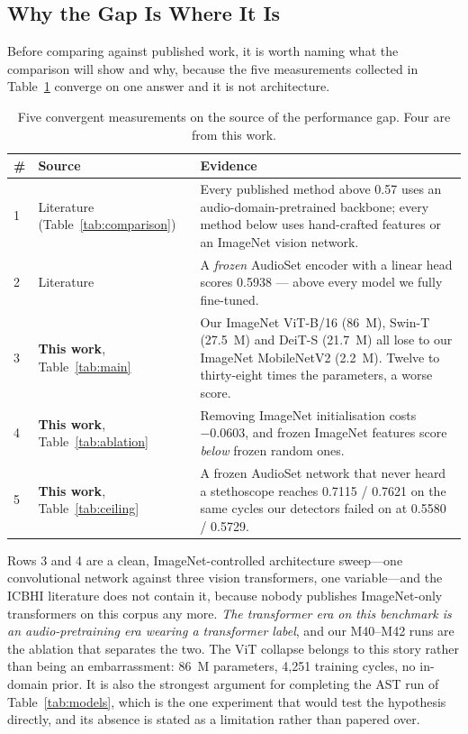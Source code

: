 \documentclass[journal,onecolumn]{IEEEtran}
\newcommand{\best}[1]{\textbf{#1}}
\begin{document}
\subsection{Why the Gap Is Where It Is}
\label{subsec:pretraining}

Before comparing against published work, it is worth naming what the comparison
will show and why, because the five measurements collected in
Table~\ref{tab:gapevidence} converge on one answer and it is not architecture.

\begin{table}[!t]
\centering
\caption{Five convergent measurements on the source of the performance gap. Four
are from this work.}
\label{tab:gapevidence}
\small
\begin{tabular}{llp{8.2cm}}
\toprule
\# & Source & Evidence \\
\midrule
1 & Literature (Table~\ref{tab:comparison}) & Every published method above 0.57 uses an audio-domain-pretrained backbone; every method below uses hand-crafted features or an ImageNet vision network. \\
2 & Literature~\cite{frozenfm2025} & A \emph{frozen} AudioSet encoder with a linear head scores 0.5938 --- above every model we fully fine-tuned. \\
3 & \best{This work}, Table~\ref{tab:main} & Our ImageNet ViT-B/16 (86~M), Swin-T (27.5~M) and DeiT-S (21.7~M) all lose to our ImageNet MobileNetV2 (2.2~M). Twelve to thirty-eight times the parameters, a worse score. \\
4 & \best{This work}, Table~\ref{tab:ablation} & Removing ImageNet initialisation costs $-0.0603$, and frozen ImageNet features score \emph{below} frozen random ones. \\
5 & \best{This work}, Table~\ref{tab:ceiling} & A frozen AudioSet network that never heard a stethoscope reaches 0.7115 / 0.7621 on the same cycles our detectors failed on at 0.5580 / 0.5729. \\
\bottomrule
\end{tabular}
\end{table}

Rows 3 and 4 are a clean, ImageNet-controlled architecture sweep---one
convolutional network against three vision transformers, one variable---and the
ICBHI literature does not contain it, because nobody publishes ImageNet-only
transformers on this corpus any more. \emph{The transformer era on this benchmark
is an audio-pretraining era wearing a transformer label}, and our M40--M42 runs are
the ablation that separates the two. The ViT collapse belongs to this story rather
than being an embarrassment: 86~M parameters, 4{,}251 training cycles, no in-domain
prior. It is also the strongest argument for completing the AST run of
Table~\ref{tab:models}, which is the one experiment that would test the hypothesis
directly, and its absence is stated as a limitation rather than papered over.
\end{document}
